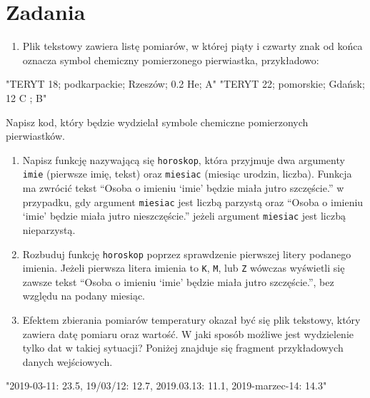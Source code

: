 \documentclass[paper=6in:9in,pagesize=pdftex,headinclude=on,footinclude=on,10pt]{scrbook}
\newenvironment{Shaded}{\begin{snugshade}}{\end{snugshade}}
\newcommand{\StringTok}[1]{\textcolor[rgb]{0.31,0.60,0.02}{#1}}
\providecommand{\tightlist}{%
  \setlength{\itemsep}{0pt}\setlength{\parskip}{0pt}}
\begin{document}
\hypertarget{zadania-5}{%
\section{Zadania}\label{zadania-5}}

\begin{enumerate}
\def\labelenumi{\arabic{enumi})}
\tightlist
\item
  Plik tekstowy zawiera listę pomiarów, w której piąty i czwarty znak od końca oznacza symbol chemiczny pomierzonego pierwiastka, przykładowo:
\end{enumerate}

\begin{Shaded}
\begin{Highlighting}[]
\StringTok{"TERYT 18; podkarpackie; Rzeszów; 0.2 He; A"}
\StringTok{"TERYT 22; pomorskie;   Gdańsk; 12 C ; B"}
\end{Highlighting}
\end{Shaded}

Napisz kod, który będzie wydzielał symbole chemiczne pomierzonych pierwiastków.

\begin{enumerate}
\def\labelenumi{\arabic{enumi})}
\setcounter{enumi}{1}
\tightlist
\item
  Napisz funkcję nazywającą się \texttt{horoskop}, która przyjmuje dwa argumenty \texttt{imie} (pierwsze imię, tekst) oraz \texttt{miesiac} (miesiąc urodzin, liczba).
  Funkcja ma zwrócić tekst ``Osoba o imieniu `imie' będzie miała jutro szczęście.'' w przypadku, gdy argument \texttt{miesiac} jest liczbą parzystą oraz ``Osoba o imieniu `imie' będzie miała jutro nieszczęście.'' jeżeli argument \texttt{miesiac} jest liczbą nieparzystą.
\item
  Rozbuduj funkcję \texttt{horoskop} poprzez sprawdzenie pierwszej litery podanego imienia. Jeżeli pierwsza litera imienia to \texttt{K}, \texttt{M}, lub \texttt{Z} wówczas wyświetli się zawsze tekst ``Osoba o imieniu `imie' będzie miała jutro szczęście.'', bez względu na podany miesiąc.
\item
  Efektem zbierania pomiarów temperatury okazał być się plik tekstowy, który zawiera datę pomiaru oraz wartość.
  W jaki sposób możliwe jest wydzielenie tylko dat w takiej sytuacji?
  Poniżej znajduje się fragment przykładowych danych wejściowych.
\end{enumerate}

\begin{Shaded}
\begin{Highlighting}[]
\StringTok{"2019-03-11: 23.5, 19/03/12: 12.7, 2019.03.13: 11.1, 2019-marzec-14: 14.3"}
\end{Highlighting}
\end{Shaded}
\end{document}
